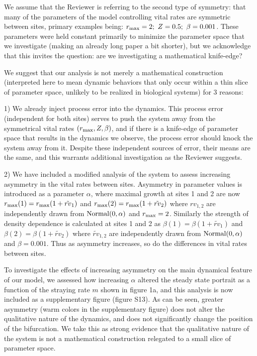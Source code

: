 \documentclass[ucm,12pt]{ucletter}
\begin{document}
\begin{letter}
We assume that the Reviewer is referring to the second type of symmetry: that many of the parameters of the model controlling vital rates are symmetric between sites, primary examples being: $r_{\rm max}=2;~Z=0.5;~\beta=0.001$.
These parameters were held constant primarily to minimize the parameter space that we investigate (making an already long paper a bit shorter), but we acknowledge that this invites the question: are we investigating a mathematical knife-edge?

We suggest that our analysis is not merely a mathematical construction (interpreted here to mean dynamic behaviors that only occur within a thin slice of parameter space, unlikely to be realized in biological systems) for 3 reasons:

1) We already inject process error into the dynamics. This process error (independent for both sites) serves to push the system away from the symmetrical vital rates $(r_{\rm max}, Z, \beta)$, and if there is a knife-edge of parameter space that results in the dynamics we observe, the process error should knock the system away from it. Despite these independent sources of error, their means are the same, and this warrants additional investigation as the Reviewer suggests.

2) We have included a modified analysis of the system to assess increasing asymmetry in the vital rates between sites. Asymmetry in parameter values is introduced as a parameter $\alpha$, where maximal growth at sites 1 and 2 are now  $r_{\rm max}(1)=r_{\rm max}(1+\tilde{rv}_1)$ and $r_{\rm max}(2)=r_{\rm max}(1+\tilde{rv}_2)$ where $rv_{1,2}$ are independently drawn from $\rm{Normal}(0,\alpha)$ and $r_{\rm max}=2$. 
Similarly the strength of density dependence is calculated at sites 1 and 2 as $\beta(1)=\beta(1+\tilde{rv}_1)$ and $\beta(2)=\beta(1+\tilde{rv}_2)$ where $\tilde{rv}_{1,2}$ are independently drawn from $\rm{Normal}(0,\alpha)$ and $\beta=0.001$.
Thus as asymmetry increases, so do the differences in vital rates between sites.

To investigate the effects of increasing asymmetry on the main dynamical feature of our model, we assessed how increasing $\alpha$ altered the steady state portrait as a function of the straying rate $m$ shown in figure 1a, and this analysis is now included as a supplementary figure (figure S13). As can be seen, greater asymmetry (warm colors in the supplementary figure) does not alter the qualitative nature of the dynamics, and does not significantly change the position of the bifurcation. We take this as strong evidence that the qualitative nature of the system is not a mathematical construction relegated to a small slice of parameter space.


\end{letter}
\end{document}
